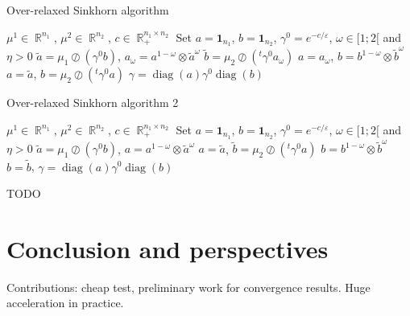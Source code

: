 \documentclass{article} %
\DeclareMathOperator{\IR}{\mathbb{R}}
\DeclareMathOperator{\diag}{diag}
\renewcommand{\epsilon}{\varepsilon}
\theoremstyle{plain}
\theoremstyle{definition}
\theoremstyle{remark}
\begin{document}
\renewcommand{\algorithmiccomment}[1]{\hfill\bgroup(#1)\egroup}
\begin{algorithm}
\caption{Over-relaxed Sinkhorn algorithm}
\label{SOR}
\begin{algorithmic}
\REQUIRE $\mu^1\in \IR^{n_1}$, $\mu^2\in \IR^{n_2}$, $c\in \IR^{n_1\times n_2}_+$
\STATE Set $a=\mathbf{1}_{n_1}$, $b=\mathbf{1}_{n_2}$, $\gamma^0=e^{-c/\epsilon}$, $\omega\in[1;2[$ and $\eta>0$
\STATE $\tilde a=\mu_1\oslash (\gamma^0 b)$,  $a_\omega=a^{1-\omega}\otimes \tilde a^\omega$
\STATE $\tilde b=\mu_2\oslash (^t\gamma^0  a_\omega)$
\STATE  $a=a_\omega$, $b=b^{1-\omega}\otimes \tilde b^\omega$
\ELSE
\STATE $a=\tilde a$, $b=\mu_2\oslash (^t\gamma^0 a)$  
\ENDIF
\ENDWHILE
 \RETURN $\gamma=\diag(a)\gamma^0\diag(b)$
\end{algorithmic}
\end{algorithm}

\begin{algorithm}
\caption{Over-relaxed Sinkhorn algorithm 2}
\label{SOR}
\begin{algorithmic}
\REQUIRE $\mu^1\in \IR^{n_1}$, $\mu^2\in \IR^{n_2}$, $c\in \IR^{n_1\times n_2}_+$
\STATE Set $a=\mathbf{1}_{n_1}$, $b=\mathbf{1}_{n_2}$, $\gamma^0=e^{-c/\epsilon}$, $\omega\in[1;2[$ and $\eta>0$
\STATE $\tilde a=\mu_1\oslash (\gamma^0 b)$, 
\STATE  $a=a^{1-\omega}\otimes \tilde a^\omega$
\ELSE
\STATE $a=\tilde a$,
\ENDIF
\STATE $\tilde b=\mu_2\oslash (^t\gamma^0  a)$
\STATE  $b=b^{1-\omega}\otimes \tilde b^\omega$
\ELSE
\STATE $b=\tilde b$,
\ENDIF
\ENDWHILE
 \RETURN $\gamma=\diag(a)\gamma^0\diag(b)$
\end{algorithmic}
\end{algorithm}



{\color{red} TODO}


\section{Conclusion and perspectives}
Contributions: 
cheap test, preliminary work for convergence results. Huge acceleration in practice.
\end{document}
